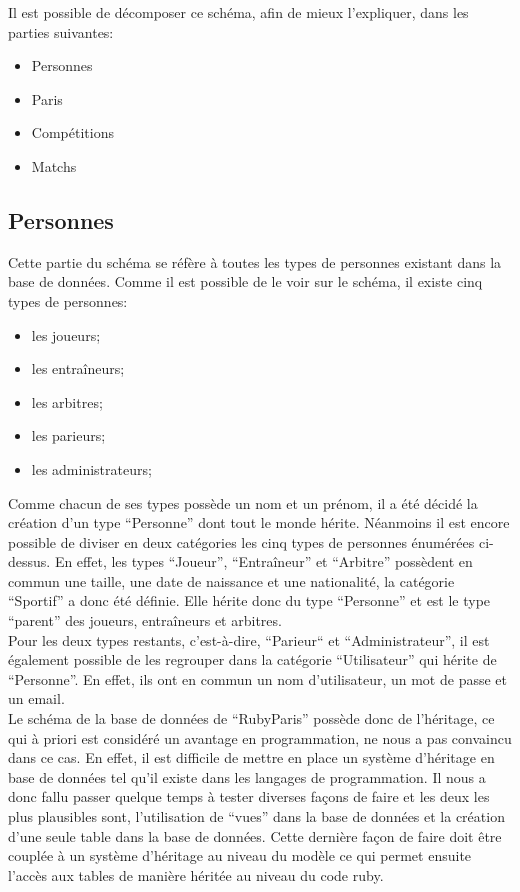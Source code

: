 \documentclass[10pt,a4paper,titlepage]{article}
\begin{document}
Il est possible de décomposer ce schéma, afin de mieux l'expliquer, dans les parties suivantes:
\begin{itemize}
	\item{Personnes}
	\item{Paris}
	\item{Compétitions}
	\item{Matchs}
\end{itemize}

\subsection{Personnes}
Cette partie du schéma se réfère à toutes les types de personnes existant dans la base de données. Comme il est possible de le voir sur le schéma, il existe cinq types de personnes:
\begin{itemize}
	\item{les joueurs;}
	\item{les entraîneurs;}
	\item{les arbitres;}
	\item{les parieurs;}
	\item{les administrateurs;\\}
\end{itemize}

Comme chacun de ses types possède un nom et un prénom, il a été décidé la création d'un type “Personne” dont tout le monde hérite. Néanmoins il est encore possible de diviser en deux catégories les cinq types de personnes énumérées ci-dessus. En effet, les types “Joueur”, “Entraîneur” et “Arbitre” possèdent en commun une taille, une date de naissance et une nationalité, la catégorie “Sportif” a donc été définie. Elle hérite donc du type “Personne” et est le type “parent” des joueurs, entraîneurs et arbitres.\\

Pour les deux types restants, c'est-à-dire, “Parieur“ et “Administrateur”, il est également possible de les regrouper dans la catégorie “Utilisateur” qui hérite de “Personne”. En effet, ils ont en commun un nom d'utilisateur, un mot de passe et un email.\\

Le schéma de la base de données de “RubyParis” possède donc de l'héritage, ce qui à priori est considéré un avantage en programmation, ne nous a pas convaincu dans ce cas. En effet, il est difficile de mettre en place un système d'héritage en base de données tel qu'il existe dans les langages de programmation. Il nous a donc fallu passer quelque temps à tester diverses façons de faire et les deux les plus plausibles sont, l'utilisation de “vues” dans la base de données et la création d'une seule table dans la base de données. Cette dernière façon de faire doit être couplée à un système d'héritage au niveau du modèle ce qui permet ensuite l'accès aux tables de manière héritée au niveau du code ruby.\\
\end{document}
